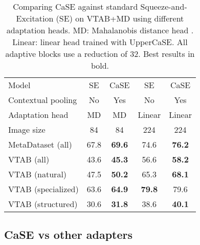 \documentclass{article}
\begin{document}
\begin{table}[H]
\caption{Comparing CaSE against standard Squeeze-and-Excitation (SE) on VTAB+MD using different adaptation heads. MD: Mahalanobis distance head \citep{bronskill2021memory}. Linear: linear head trained with UpperCaSE.  All adaptive blocks use a reduction of 32. Best results in bold.}
\vskip 0.15in
\begin{center}
\begin{tabular}{lcc|cc}
\toprule
Model & SE & CaSE & SE & CaSE \\
Contextual pooling & No & Yes & No & Yes \\
Adaptation head & MD & MD & Linear & Linear \\
Image size & 84 & 84 & 224 & 224\\
\midrule
MetaDataset (all) & 67.8 & \textbf{69.6} & 74.6 & \textbf{76.2} \\
VTAB (all) & 43.6 & \textbf{45.3} & 56.6 & \textbf{58.2} \\
VTAB (natural) & 47.5 & \textbf{50.2} & 65.3 & \textbf{68.1} \\
VTAB (specialized) & 63.6 & \textbf{64.9} & \textbf{79.8} & 79.6 \\
VTAB (structured) & 30.6 & \textbf{31.8} & 38.6 & \textbf{40.1} \\
\bottomrule
\end{tabular}
\label{tab:se_vs_case}
\end{center}
\vskip -0.1in
\end{table}

\subsection{CaSE vs other adapters} \label{appendix:ssec_case_vs_adapters}
\end{document}
